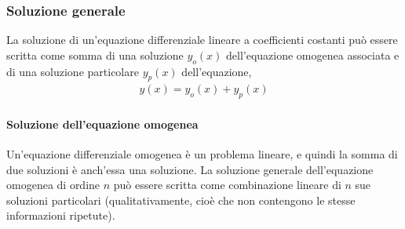 \documentclass[letterpaper,10pt,italian]{jupyterBook}
\begin{document}
\subsubsection{Soluzione generale}
\label{\detokenize{ch/ode:soluzione-generale}}\label{\detokenize{ch/ode:ode-hs-types-linear-const-sol}}
\sphinxAtStartPar
La soluzione di un’equazione differenziale lineare a coefficienti costanti può essere scritta come somma di una soluzione \(y_o(x)\) dell’equazione omogenea associata e di una soluzione particolare \(y_p(x)\) dell’equazione,
\begin{equation*}
\begin{split}y(x) = y_o(x) + y_p(x)\end{split}
\end{equation*}

\paragraph{Soluzione dell’equazione omogenea}
\label{\detokenize{ch/ode:soluzione-dell-equazione-omogenea}}\label{\detokenize{ch/ode:ode-hs-types-linear-const-sol-homo}}
\sphinxAtStartPar
Un’equazione differenziale omogenea è un problema lineare, e quindi la somma di due soluzioni è anch’essa una soluzione. La soluzione generale dell’equazione omogenea di ordine \(n\) può essere scritta come combinazione lineare di \(n\) sue soluzioni particolari  (qualitativamente, cioè che non contengono le stesse informazioni ripetute).
\end{document}

